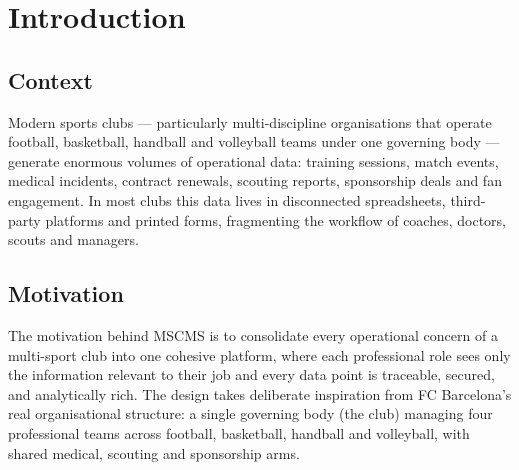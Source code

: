 \documentclass[12pt,a4paper,oneside]{report}
\begin{document}
\tableofcontents

\chapter{Introduction}
\label{ch:intro}

\section{Context}
Modern sports clubs --- particularly multi-discipline organisations that
operate football, basketball, handball and volleyball teams under one
governing body --- generate enormous volumes of operational data: training
sessions, match events, medical incidents, contract renewals, scouting
reports, sponsorship deals and fan engagement. In most clubs this data lives
in disconnected spreadsheets, third-party platforms and printed forms,
fragmenting the workflow of coaches, doctors, scouts and managers.

\section{Motivation}
The motivation behind MSCMS is to consolidate every operational concern of
a multi-sport club into one cohesive platform, where each professional role
sees only the information relevant to their job and every data point is
traceable, secured, and analytically rich. The design takes deliberate
inspiration from FC Barcelona's real organisational structure: a single
governing body (the club) managing four professional teams across football,
basketball, handball and volleyball, with shared medical, scouting and
sponsorship arms.
\end{document}
